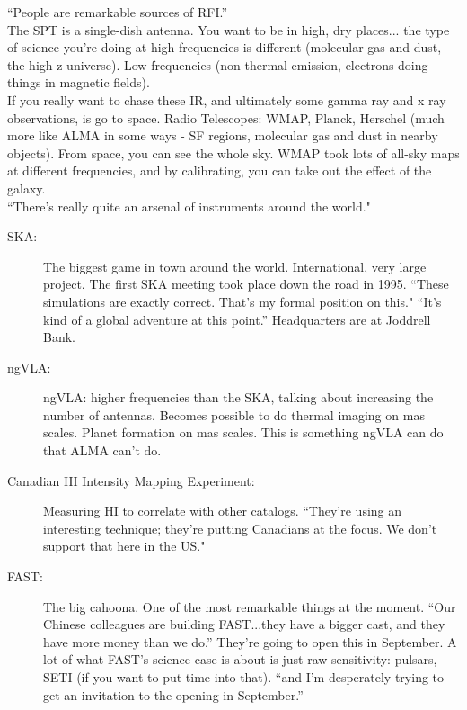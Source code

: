 \documentclass[a4paper]{article}
\begin{document}
``People are remarkable sources of RFI.'' \\

The SPT is a single-dish antenna. You want to be in high, dry places... the type of science you're doing at high frequencies is different (molecular gas and dust, the high-z universe). Low frequencies (non-thermal emission, electrons doing things in magnetic fields). \\

If you really want to chase these IR, and ultimately some gamma ray and x ray observations, is go to space. Radio Telescopes: WMAP, Planck, Herschel (much more like ALMA in some ways - SF regions, molecular gas and dust in nearby objects). From space, you can see the whole sky. WMAP took lots of all-sky maps at different frequencies, and by calibrating, you can take out the effect of the galaxy. \\

``There's really quite an arsenal of instruments around the world." \\

\begin{description}

\item[SKA:] The biggest game in town around the world. International, very large project. The first SKA meeting took place down the road in 1995. ``These simulations are exactly correct. That's my formal position on this." ``It's kind of a global adventure at this point.'' Headquarters are at Joddrell Bank.

\item[ngVLA:] ngVLA: higher frequencies than the SKA, talking about increasing the number of antennas. Becomes possible to do thermal imaging on mas scales. Planet formation on mas scales. This is something ngVLA can do that ALMA can't do. 

\item[Canadian HI Intensity Mapping Experiment:] Measuring HI to correlate with other catalogs. ``They're using an interesting technique; they're putting Canadians at the focus. We don't support that here in the US." 

\item[FAST:] The big cahoona. One of the most remarkable things at the moment. ``Our Chinese colleagues are building FAST...they have a bigger cast, and they have more money than we do.'' They're going to open this in September. A lot of what FAST's science case is about is just raw sensitivity: pulsars, SETI (if you want to put time into that). ``and I'm desperately trying to get an invitation to the opening in September.''

\end{description}
\end{document}
